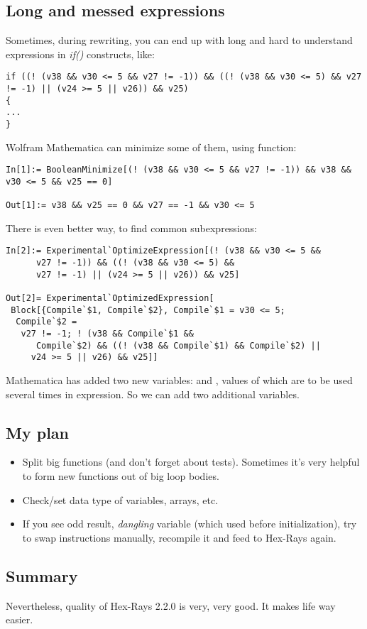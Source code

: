 \subsection{Long and messed expressions}

Sometimes, during rewriting, you can end up with long and hard to understand expressions in \emph{if()} constructs, like:

\begin{lstlisting}[style=customc]
if ((! (v38 && v30 <= 5 && v27 != -1)) && ((! (v38 && v30 <= 5) && v27 != -1) || (v24 >= 5 || v26)) && v25)
{
...
}
\end{lstlisting}

Wolfram Mathematica can minimize some of them, using  function:

\begin{lstlisting}
In[1]:= BooleanMinimize[(! (v38 && v30 <= 5 && v27 != -1)) && v38 && v30 <= 5 && v25 == 0]

Out[1]:= v38 && v25 == 0 && v27 == -1 && v30 <= 5
\end{lstlisting}

There is even better way, to find common subexpressions:

\begin{lstlisting}
In[2]:= Experimental`OptimizeExpression[(! (v38 && v30 <= 5 && 
      v27 != -1)) && ((! (v38 && v30 <= 5) && 
      v27 != -1) || (v24 >= 5 || v26)) && v25]

Out[2]= Experimental`OptimizedExpression[
 Block[{Compile`$1, Compile`$2}, Compile`$1 = v30 <= 5; 
  Compile`$2 = 
   v27 != -1; ! (v38 && Compile`$1 && 
      Compile`$2) && ((! (v38 && Compile`$1) && Compile`$2) || 
     v24 >= 5 || v26) && v25]]
\end{lstlisting}

Mathematica has added two new variables:  and , values of which are to be used several times in expression.
So we can add two additional variables.

\subsection{My plan}

\begin{itemize}
\item Split big functions (and don't forget about tests).
Sometimes it's very helpful to form new functions out of big loop bodies.

\item Check/set data type of variables, arrays, etc.

\item If you see odd result, \emph{dangling} variable (which used before initialization), try to swap instructions manually,
recompile it and feed to Hex-Rays again.
\end{itemize}

\subsection{Summary}

Nevertheless, quality of Hex-Rays 2.2.0 is very, very good.
It makes life way easier.

